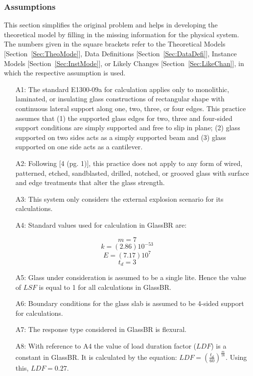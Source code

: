 \documentclass[12pt]{article}
\begin{document}
\subsubsection{Assumptions}
\label{Sec:Assu}
This section simplifies the original problem and helps in developing the theoretical model by filling in the missing information for the physical system. The numbers given in the square brackets refer to the Theoretical Models [Section~\ref{Sec:TheoMode}], Data Definitions [Section~\ref{Sec:DataDefi}], Instance Models [Section~\ref{Sec:InstMode}], or Likely Changes [Section~\ref{Sec:LikeChan}], in which the respective assumption is used.
\begin{itemize}
\item[A1:]The standard E1300-09a for calculation applies only to monolithic, laminated, or insulating glass constructions of rectangular shape with continuous lateral support along one, two, three, or four edges. This practice assumes that (1) the supported glass edges for two, three and four-sided support conditions are simply supported and free to slip in plane; (2) glass supported on two sides acts as a simply supported beam and (3) glass supported on one side acts as a cantilever.
\item[A2:]Following [4 (pg. 1)], this practice does not apply to any form of wired, patterned, etched, sandblasted, drilled, notched, or grooved glass with surface and edge treatments that alter the glass strength.
\item[A3:]This system only considers the external explosion scenario for its calculations.
\item[A4:]Standard values used for calculation in GlassBR are:
\end{itemize}
\begin{equation}
m=7
\end{equation}
\begin{equation}
k=(2.86)10^{-53}
\end{equation}
\begin{equation}
E=(7.17)10^{7}
\end{equation}
\begin{equation}
t_{d}=3
\end{equation}
\begin{itemize}
\item[A5:]Glass under consideration is assumed to be a single lite. Hence the value of $LSF$ is equal to 1 for all calculations in GlassBR.
\item[A6:]Boundary conditions for the glass slab is assumed to be 4-sided support for calculations.
\item[A7:]The response type considered in GlassBR is flexural.
\item[A8:]With reference to A4 the value of load duration factor ($LDF$) is a constant in GlassBR. It is calculated by the equation: $LDF=\left(\frac{t_{d}}{60}\right)^{\frac{m}{16}}$. Using this, $LDF=0.27$.
\end{itemize}
\end{document}

